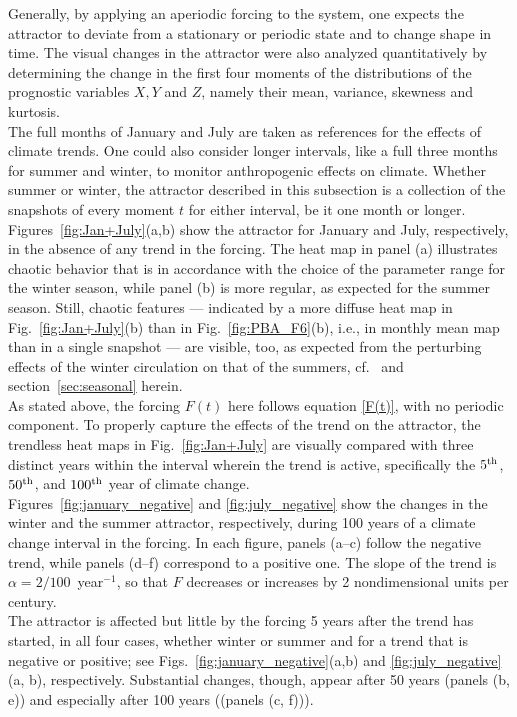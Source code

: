 \documentclass[%
 aip, cha,
 amsmath,amssymb,
 reprint,%
author-year,%
]{revtex4-1}
\newcommand{\0}{\mathbf 0}
\begin{document}
Generally, by applying an aperiodic forcing to the system, one expects the attractor to deviate from a stationary or periodic state and to change shape in time. The visual changes in the attractor were also analyzed quantitatively by determining the change in the first four moments of the distributions of the prognostic variables $X, Y$ and $Z$, namely their mean, variance, skewness and kurtosis. \\
The full months of January and July are taken as references for the effects of climate trends. One could also consider longer intervals, like a full three months for summer and winter, to monitor anthropogenic effects on climate. Whether summer or winter, the attractor described in this subsection is a collection of the snapshots of every moment $t$ for either interval, be it one month or longer. \\
Figures~\ref{fig:Jan+July}(a,b) show the attractor for January and July, respectively, in the absence of any trend in the forcing. 
The heat map in panel (a) illustrates chaotic behavior that is in accordance with the choice of the parameter range for the winter season, while panel (b) is more regular, as expected for the summer season. Still,  chaotic features — indicated by a more diffuse heat map in Fig.~\ref{fig:Jan+July}(b) than in Fig.~\ref{fig:PBA_F6}(b), i.e., in monthly mean map than in a single snapshot — are visible, too, as expected from the perturbing effects of the winter circulation on that of the summers, cf.~\cite{lorenz90} and  section~\ref{sec:seasonal} herein. \\ 
As stated above, the forcing $F(t)$ here follows equation \eqref{F(t)}, with no periodic component. To properly capture the effects of the trend on the attractor, the trendless heat maps in Fig.~\ref{fig:Jan+July} are visually compared with three distinct years within the interval wherein the trend is active, specifically the $5^{\rm{th}}$, $50^{\rm{th}}$, and $100^{\rm{th}}$ year of climate change. \\
Figures~\ref{fig:january_negative} and \ref{fig:july_negative} show the changes in the winter and the summer attractor, respectively, during 100 years of a climate change interval in the forcing. In each figure, panels (a--c) follow the negative trend, while panels (d--f) correspond to a positive one. The slope of the trend is $\alpha = 2/100$~year$^{-1}$, so that $F$ decreases or increases by 2 nondimensional units per century.\\
The attractor is affected but little by the forcing 5 years after the trend has started, in all four cases, whether winter or summer and for a trend that is negative or positive; see Figs.~\ref{fig:january_negative}(a,b) and \ref{fig:july_negative}(a, b), respectively. Substantial changes, though, appear after 50 years (panels (b, e)) and especially after 100 years ((panels (c, f))).
\end{document}
